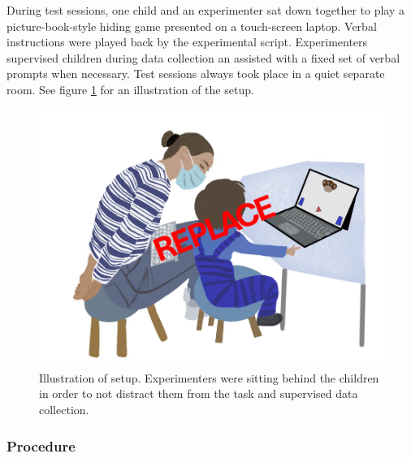 \documentclass[
  man]{apa6}
\begin{document}
During test sessions, one child and an experimenter sat down together to play a picture-book-style hiding game presented on a touch-screen laptop. Verbal instructions were played back by the experimental script. Experimenters supervised children during data collection an assisted with a fixed set of verbal prompts when necessary. Test sessions always took place in a quiet separate room. See figure \ref{fig:figure-setup} for an illustration of the setup.



\begin{figure}

{\centering \includegraphics{../illustrations/Symlit_Rep_Setup} 

}

\caption{Illustration of setup. Experimenters were sitting behind the children in order to not distract them from the task and supervised data collection.}\label{fig:figure-setup}
\end{figure}

\subsubsection{Procedure}\label{procedure}
\end{document}

